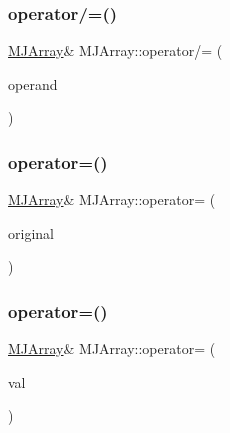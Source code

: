 \hypertarget{classMJArray_a376204e0aa5fc772aa881598e77020fc}{}\label{classMJArray_a376204e0aa5fc772aa881598e77020fc} 
\subsubsection{\texorpdfstring{operator/=()}{operator/=()}\hspace{0.1cm}{\footnotesize\ttfamily [2/2]}}
{\footnotesize\ttfamily \hyperlink{classMJArray}{M\+J\+Array}\& M\+J\+Array\+::operator/= (\begin{DoxyParamCaption}\item[{const double \&}]{operand }\end{DoxyParamCaption})}

\hypertarget{classMJArray_aa9e039dcbf214e52e99a06d31ae7d240}{}\label{classMJArray_aa9e039dcbf214e52e99a06d31ae7d240} 
\subsubsection{\texorpdfstring{operator=()}{operator=()}\hspace{0.1cm}{\footnotesize\ttfamily [1/2]}}
{\footnotesize\ttfamily \hyperlink{classMJArray}{M\+J\+Array}\& M\+J\+Array\+::operator= (\begin{DoxyParamCaption}\item[{const \hyperlink{classMJArray}{M\+J\+Array} \&}]{original }\end{DoxyParamCaption})}

\hypertarget{classMJArray_a5c7b21d9d8d045c886de8e5a18d34c98}{}\label{classMJArray_a5c7b21d9d8d045c886de8e5a18d34c98} 
\subsubsection{\texorpdfstring{operator=()}{operator=()}\hspace{0.1cm}{\footnotesize\ttfamily [2/2]}}
{\footnotesize\ttfamily \hyperlink{classMJArray}{M\+J\+Array}\& M\+J\+Array\+::operator= (\begin{DoxyParamCaption}\item[{const double \&}]{val }\end{DoxyParamCaption})}

